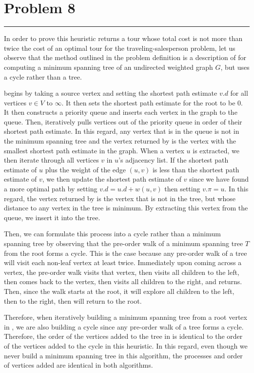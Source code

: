 \documentclass[11pt]{article}
\def\separateline{\medskip\hrule\medskip}
\begin{document}
\newpage

\section{Problem 8}
\separateline

In order to prove this heuristic returns a tour whose total cost is not more than twice the cost of an optimal tour for the traveling-salesperson problem, let us observe that the method outlined in the problem definition is a description of  for computing a minimum spanning tree of an undirected weighted graph $G$, but uses a cycle rather than a tree.

 begins by taking a source vertex and setting the shortest path estimate $v.d$ for all vertices $v \in V$ to $\infty$. It then sets the shortest path estimate for the root to be 0. It then constructs a priority queue and inserts each vertex in the graph to the queue. Then,  iteratively pulls vertices out of the priority queue in order of their shortest path estimate. In this regard, any vertex that is in the queue is not in the minimum spanning tree and the vertex returned by  is the vertex with the smallest shortest path estimate in the graph. When a vertex $u$ is extracted, we then iterate through all vertices $v$ in $u$'s adjacency list. If the shortest path estimate of $u$ plus the weight of the edge $(u,v)$ is less than the shortest path estimate of $v$, we then update the shortest path estimate of $v$ since we have found a more optimal path by setting $v.d = u.d + w(u,v)$ then setting $v.\pi = u$. In this regard, the vertex returned by  is the vertex that is not in the tree, but whose distance to any vertex in the tree is minimum. By extracting this vertex from the queue, we insert it into the tree.

Then, we can formulate this process into a cycle rather than a minimum spanning tree by observing that the pre-order walk of a minimum spanning tree $T$ from the root forms a cycle. This is the case because any pre-order walk of a tree will visit each non-leaf vertex at least twice. Immediately upon coming across a vertex, the pre-order walk visits that vertex, then visits all children to the left, then comes back to the vertex, then visits all children to the right, and returns. Then, since the walk starts at the root, it will explore all children to the left, then to the right, then will return to the root.

Therefore, when iteratively building a minimum spanning tree from a root vertex in , we are also building a cycle since any pre-order walk of a tree forms a cycle. Therefore, the order of the vertices added to the tree in  is identical to the order of the vertices added to the cycle in this heuristic. In this regard, even though we never build a minimum spanning tree in this algorithm, the processes and order of vertices added are identical in both algorithms.
\end{document}
